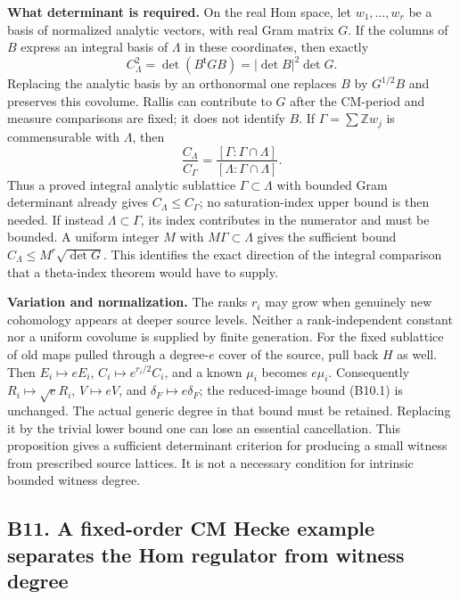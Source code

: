 \documentclass[11pt,a4paper]{article}
\theoremstyle{definition}
\begin{document}
\textbf{What determinant is required.} On the real Hom space, let \(w_1,\ldots,w_r\) be a basis of normalized analytic vectors, with real Gram matrix \(G\). If the columns of \(B\) express an integral basis of \(\Lambda\) in these coordinates, then exactly \[
 C_\Lambda^2=\det(B^{\mathsf t}GB)=|\det B|^2\det G.
\tag{B10.3}
\] Replacing the analytic basis by an orthonormal one replaces \(B\) by \(G^{1/2}B\) and preserves this covolume. Rallis can contribute to \(G\) after the CM-period and measure comparisons are fixed; it does not identify \(B\). If \(\Gamma=\sum\mathbb Zw_j\) is commensurable with \(\Lambda\), then \[
 \frac{C_\Lambda}{C_\Gamma}
 =\frac{[\Gamma:\Gamma\cap\Lambda]}{[\Lambda:\Gamma\cap\Lambda]}.
\] Thus a proved integral analytic sublattice \(\Gamma\subset\Lambda\) with bounded Gram determinant already gives \(C_\Lambda\le C_\Gamma\); no saturation-index upper bound is then needed. If instead \(\Lambda\subset\Gamma\), its index contributes in the numerator and must be bounded. A uniform integer \(M\) with \(M\Gamma\subset\Lambda\) gives the sufficient bound \(C_\Lambda\le M^r\sqrt{\det G}\). This identifies the exact direction of the integral comparison that a theta-index theorem would have to supply.

\textbf{Variation and normalization.} The ranks \(r_i\) may grow when genuinely new cohomology appears at deeper source levels. Neither a rank-independent constant nor a uniform covolume is supplied by finite generation. For the fixed sublattice of old maps pulled through a degree-\(e\) cover of the source, pull back \(H\) as well. Then \(E_i\mapsto eE_i\), \(C_i\mapsto e^{r_i/2}C_i\), and a known \(\mu_i\) becomes \(e\mu_i\). Consequently \(R_i\mapsto\sqrt e R_i\), \(V\mapsto eV\), and \(\delta_F\mapsto e\delta_F\); the reduced-image bound (B10.1) is unchanged. The actual generic degree in that bound must be retained. Replacing it by the trivial lower bound one can lose an essential cancellation. This proposition gives a sufficient determinant criterion for producing a small witness from prescribed source lattices. It is not a necessary condition for intrinsic bounded witness degree.

\subsection{B11. A fixed-order CM Hecke example separates the Hom regulator from witness degree}\label{b11.-a-fixed-order-cm-hecke-example-separates-the-hom-regulator-from-witness-degree}
\end{document}
